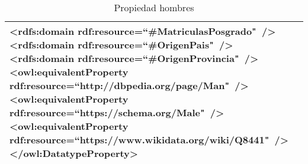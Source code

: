 \begin{table}[!ht]
\begin{tabular}{|p{}|p{}|}
		\tab\textless rdfs:domain\newline
		\tab\tab rdf:resource=``\#MatriculasPosgrado"\ /\textgreater\newline
		\tab\textless rdfs:domain\newline
		\tab\tab rdf:resource=``\#OrigenPais"\ /\textgreater\newline
		\tab\textless rdfs:domain\newline
		\tab\tab rdf:resource=``\#OrigenProvincia"\ /\textgreater\newline
		\tab\textless owl:equivalentProperty\newline
		\tab\tab rdf:resource=``http://dbpedia.org/page/Man"\  /\textgreater\newline
		\tab\textless owl:equivalentProperty\newline
		\tab\tab rdf:resource=``https://schema.org/Male"\  /\textgreater\newline
		\tab\textless owl:equivalentProperty\newline
		\tab\tab rdf:resource=``https://www.wikidata.org/wiki/Q8441"\  /\textgreater\newline
		\textless /owl:DatatypeProperty\textgreater
		\\ \hline
	\end{tabular}
	\caption{Propiedad hombres}
	\label{propiedad-hombres}
\end{table}

